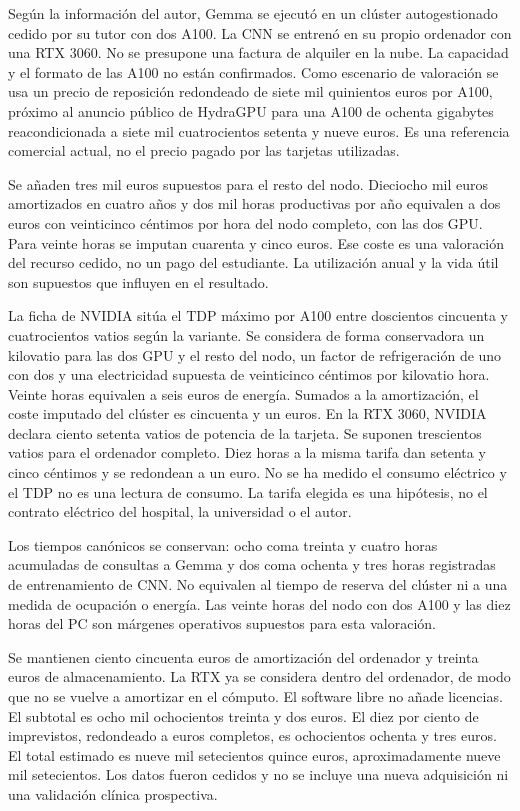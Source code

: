 \documentclass[11pt,a4paper]{article}
\begin{document}
Según la información del autor, Gemma se ejecutó en un clúster autogestionado cedido por su tutor con dos A100. La CNN se entrenó en su propio ordenador con una RTX 3060. No se presupone una factura de alquiler en la nube. La capacidad y el formato de las A100 no están confirmados. Como escenario de valoración se usa un precio de reposición redondeado de siete mil quinientos euros por A100, próximo al anuncio público de HydraGPU para una A100 de ochenta gigabytes reacondicionada a siete mil cuatrocientos setenta y nueve euros. Es una referencia comercial actual, no el precio pagado por las tarjetas utilizadas.

Se añaden tres mil euros supuestos para el resto del nodo. Dieciocho mil euros amortizados en cuatro años y dos mil horas productivas por año equivalen a dos euros con veinticinco céntimos por hora del nodo completo, con las dos GPU. Para veinte horas se imputan cuarenta y cinco euros. Ese coste es una valoración del recurso cedido, no un pago del estudiante. La utilización anual y la vida útil son supuestos que influyen en el resultado.

La ficha de NVIDIA sitúa el TDP máximo por A100 entre doscientos cincuenta y cuatrocientos vatios según la variante. Se considera de forma conservadora un kilovatio para las dos GPU y el resto del nodo, un factor de refrigeración de uno con dos y una electricidad supuesta de veinticinco céntimos por kilovatio hora. Veinte horas equivalen a seis euros de energía. Sumados a la amortización, el coste imputado del clúster es cincuenta y un euros. En la RTX 3060, NVIDIA declara ciento setenta vatios de potencia de la tarjeta. Se suponen trescientos vatios para el ordenador completo. Diez horas a la misma tarifa dan setenta y cinco céntimos y se redondean a un euro. No se ha medido el consumo eléctrico y el TDP no es una lectura de consumo. La tarifa elegida es una hipótesis, no el contrato eléctrico del hospital, la universidad o el autor.

Los tiempos canónicos se conservan: ocho coma treinta y cuatro horas acumuladas de consultas a Gemma y dos coma ochenta y tres horas registradas de entrenamiento de CNN. No equivalen al tiempo de reserva del clúster ni a una medida de ocupación o energía. Las veinte horas del nodo con dos A100 y las diez horas del PC son márgenes operativos supuestos para esta valoración.

Se mantienen ciento cincuenta euros de amortización del ordenador y treinta euros de almacenamiento. La RTX ya se considera dentro del ordenador, de modo que no se vuelve a amortizar en el cómputo. El software libre no añade licencias. El subtotal es ocho mil ochocientos treinta y dos euros. El diez por ciento de imprevistos, redondeado a euros completos, es ochocientos ochenta y tres euros. El total estimado es nueve mil setecientos quince euros, aproximadamente nueve mil setecientos. Los datos fueron cedidos y no se incluye una nueva adquisición ni una validación clínica prospectiva.
\end{document}
